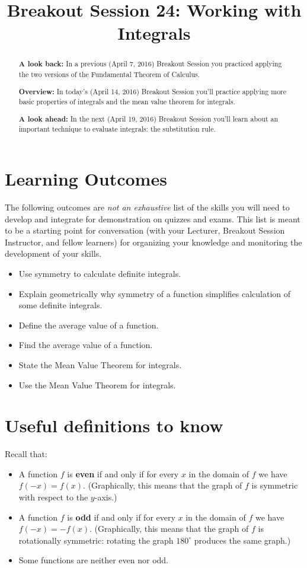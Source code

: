 \documentclass[handout, nooutcomes]{ximera}
\title{Breakout Session 24: Working with Integrals}
\begin{document}
\begin{abstract}
  \textbf{A look back:} In a previous (April 7, 2016) Breakout Session you practiced applying the two versions of the Fundamental Theorem of Calculus.

  \textbf{Overview:} In today's (April 14, 2016) Breakout Session you'll practice applying more basic properties of integrals and the mean value theorem for integrals.
  
  \textbf{A look ahead:} In the next (April 19, 2016) Breakout Session you'll learn about an important technique to evaluate integrals: the substitution rule.
\end{abstract}
\maketitle

\section{Learning Outcomes}
\label{section:learning-outcomes}
The following outcomes are \emph{not an exhaustive} list of the skills you will need to develop and integrate for demonstration on quizzes and exams.
This list is meant to be a starting point for conversation (with your Lecturer, Breakout Session Instructor, and fellow learners) for organizing your knowledge and monitoring the development of your skills.

\begin{itemize}
  \item Use symmetry to calculate definite integrals. 
  \item Explain geometrically why symmetry of a function simplifies calculation of some definite integrals.
  \item Define the average value of a function.
  \item Find the average value of a function.
  \item State the Mean Value Theorem for integrals.
  \item Use the Mean Value Theorem for integrals.
\end{itemize}
\newpage

\section{Useful definitions to know}
Recall that:
\begin{itemize}
  \item 
    A function $f$ is \textbf{even} if and only if for every $x$ in the domain of $f$ we have $f(-x) = f(x)$.
    (Graphically, this means that the graph of $f$ is symmetric with respect to the $y$-axis.)

  \item 
    A function $f$ is \textbf{odd} if and only if for every $x$ in the domain of $f$ we have $f(-x) = -f(x)$.
   (Graphically, this means that the graph of $f$ is rotationally symmetric: rotating the graph $180^\circ$ produces the same graph.)

 \item 
   Some functions are neither even nor odd.
\end{itemize}
\end{document}
